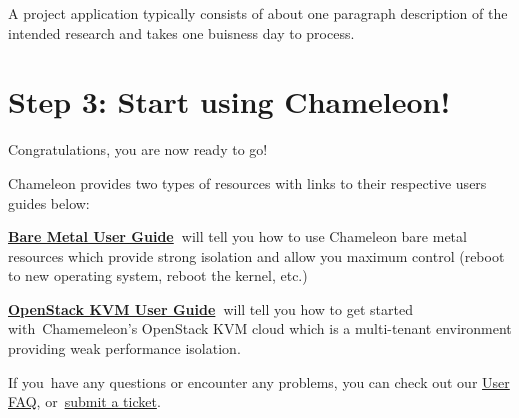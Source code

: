 A project application typically consists of about one paragraph
description of the intended research and takes one buisness day to
process.~

\section{Step 3: Start using Chameleon!}\label{using-chameleon}

Congratulations, you are now ready to go!

Chameleon provides two types of resources with links to their respective
users guides below:

\textbf{\href{https://www.chameleoncloud.org/docs/bare-metal-user-guide-old/}{Bare
Metal User Guide}~}will tell you how to use Chameleon bare metal
resources which provide strong isolation and allow you maximum control
(reboot to new operating system, reboot the kernel, etc.)

\textbf{\href{https://www.chameleoncloud.org/docs/user-guides/openstack-kvm-user-guide/}{OpenStack
KVM User Guide}~}will tell you how to get started with~Chamemeleon's
OpenStack KVM cloud which is a multi-tenant environment providing weak
performance isolation.~

If you~have any questions or encounter any problems, you can check out
our \href{https://www.chameleoncloud.org/docs/user-faq/}{User FAQ},
or~\href{https://www.chameleoncloud.org/user/help/}{submit a ticket}.

